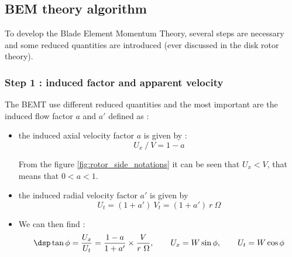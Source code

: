 
\subsection{BEM theory algorithm}


To develop the Blade Element Momentum Theory, several steps are necessary and some reduced quantities are 
introduced (ever discussed in the disk rotor theory).

\subsubsection{\sc Step 1 : induced factor and apparent velocity}


The BEMT use different reduced quantities and the most important are the induced flow factor $a$ and $a'$ defined as :

\begin{itemize}
\item the induced axial velocity factor $a$ is given by :
  \begin{equation}
  U_x~/~V = 1 - a
  \label{eq:a_def}
  \end{equation}

From the figure \ref{fig:rotor_side_notations} it can be seen that $U_x < V$, that means that $0 < a < 1$.

\item the induced radial velocity factor $a'$ is given by 
  \begin{equation}
    U_t  = (1+a')~V_t = (1+a') ~r~\Omega
  \label{eq:aprime_def}
  \end{equation}

\item We can then find :
\begin{equation} \dsp
\tan \phi = \frac{U_x}{U_t} = \frac{1 - a}{1+a'} \times \frac{V}{r~\Omega}, \qquad U_x = W \sin\phi, \qquad U_t = W \cos\phi
\label{eq:tanphi}
\end{equation}
\end{itemize}

